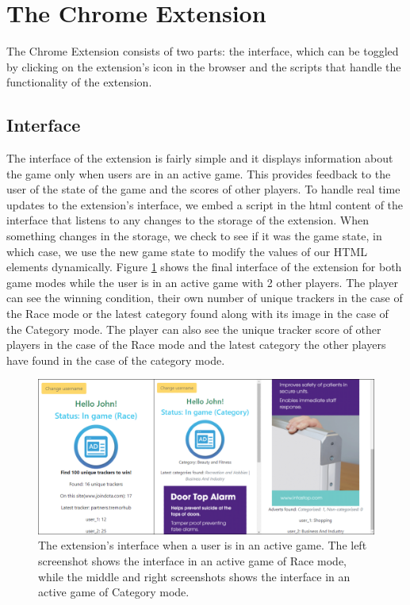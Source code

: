 \documentclass{l4proj}
\begin{document}
\section{The Chrome Extension}
The Chrome Extension consists of two parts: the interface, which can be toggled by clicking on the extension's icon in the browser and the scripts that handle the functionality of the extension.

\subsection{Interface}
The interface of the extension is fairly simple and it displays information about the game only when users are in an active game. This provides feedback to the user of the state of the game and the scores of other players. To handle real time updates to the extension's interface, we embed a script in the html content of the interface that listens to any changes to the storage of the extension. When something changes in the storage, we check to see if it was the game state, in which case, we use the new game state to modify the values of our HTML elements dynamically. Figure \ref{fig:ext} shows the final interface of the extension for both game modes while the user is in an active game with 2 other players. The player can see the winning condition, their own number of unique trackers in the case of the Race mode or the latest category found along with its image in the case of the Category mode. The player can also see the unique tracker score of other players in the case of the Race mode and the latest category the other players have found in the case of the category mode.

\begin{figure}
    \centering
    \includegraphics[width=1\linewidth]{images/ext.png}    

    \caption{The extension's interface when a user is in an active game. The left screenshot shows the interface in an active game of Race mode, while the middle and right screenshots shows the interface in an active game of Category mode.}

    \label{fig:ext} 
\end{figure}
\end{document}
